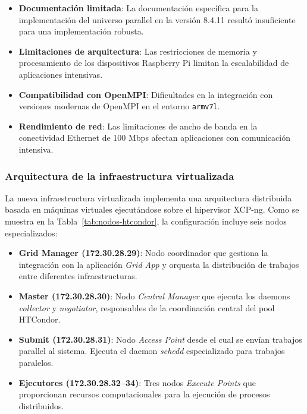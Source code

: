 \begin{itemize}
	\item \textbf{Documentación limitada}: La documentación específica para la implementación del universo parallel en la versión 8.4.11 resultó insuficiente para una implementación robusta.

	\item \textbf{Limitaciones de arquitectura}: Las restricciones de memoria y procesamiento de los dispositivos Raspberry Pi limitan la escalabilidad de aplicaciones \MPI intensivas.

	\item \textbf{Compatibilidad con OpenMPI}: Dificultades en la integración con versiones modernas de OpenMPI en el entorno \texttt{armv7l}.

	\item \textbf{Rendimiento de red}: Las limitaciones de ancho de banda en la conectividad Ethernet de 100 Mbps afectan aplicaciones con comunicación intensiva.
\end{itemize}

\subsubsection{Arquitectura de la infraestructura virtualizada}
\noindent

La nueva infraestructura virtualizada implementa una arquitectura distribuida basada en máquinas virtuales ejecutándose sobre el hipervisor XCP-ng. Como se muestra en la Tabla~\ref{tab:nodos-htcondor}, la configuración incluye seis nodos especializados:

\begin{itemize}
	\item \textbf{Grid Manager (172.30.28.29)}: Nodo coordinador que gestiona la integración con la aplicación \textit{Grid App} y orquesta la distribución de trabajos entre diferentes infraestructuras.

	\item \textbf{Master (172.30.28.30)}: Nodo \textit{Central Manager} que ejecuta los daemons \textit{collector} y \textit{negotiator}, responsables de la coordinación central del pool HTCondor.

	\item \textbf{Submit (172.30.28.31)}: Nodo \textit{Access Point} desde el cual se envían trabajos parallel al sistema. Ejecuta el daemon \textit{schedd} especializado para trabajos paralelos.

	\item \textbf{Ejecutores (172.30.28.32--34)}: Tres nodos \textit{Execute Points} que proporcionan recursos computacionales para la ejecución de procesos \MPI distribuidos.
\end{itemize}


